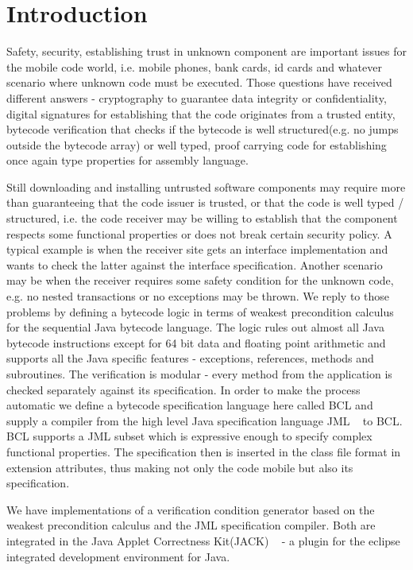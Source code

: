 
\section{Introduction}\label{intro}
Safety, security, establishing trust in unknown component are important issues for the mobile code world, i.e. mobile phones, bank cards, id cards and whatever scenario where 
unknown code must be executed. Those questions have received different answers - cryptography to guarantee data integrity or confidentiality,
 digital signatures for establishing that the code originates from a trusted entity, bytecode verification that checks if the bytecode is well structured(e.g. no jumps outside the bytecode array) or well typed, proof carrying code for establishing once again type properties for assembly language.  

Still downloading and installing untrusted software components may require more than guaranteeing that the code issuer is trusted, or that the code is well typed / structured, i.e. the code receiver may be willing to establish that the component respects some functional properties or does not break certain security policy. 
A typical example is when the receiver site gets an interface implementation and wants to check the latter against the interface specification. Another scenario may be when the receiver requires some safety condition for the unknown code, e.g. no nested transactions or no exceptions may be thrown.  
We reply to those problems by defining a bytecode logic in terms of weakest precondition calculus for the sequential Java bytecode language. The logic rules out almost all Java bytecode instructions except for 64 bit data and floating point arithmetic and supports all the Java specific features - exceptions, references, methods and subroutines. The verification is modular  -  every method from the application is checked separately against its specification. In order to make the process automatic we define a bytecode specification language here called BCL and supply a compiler from the high level Java specification language JML ~\cite{JMLRefMan} to BCL. BCL supports a JML subset which is expressive enough to specify complex functional properties. The specification then is inserted in the class file format in extension attributes, thus making not only the code mobile but also its specification.

We have implementations of a verification condition generator based on the weakest precondition calculus and the JML specification compiler. Both are integrated in the Java Applet Correctness Kit(JACK) ~\cite{BRL-JACK} - a plugin for the eclipse integrated development environment for Java.

